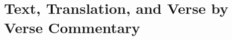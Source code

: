 \documentclass[10pt,twoside,openany]{book}
\begin{document}
\frontmatter

\lhead[\small\thepage]{}
\rhead[]{\small\thepage}
\chead[]{}
\cfoot[]{}


\newpage
 

\newpage


\newpage


\newpage


\newpage



\tableofcontents

\mainmatter

\part{Text, Translation, and Verse by Verse Commentary}




















\end{document}

